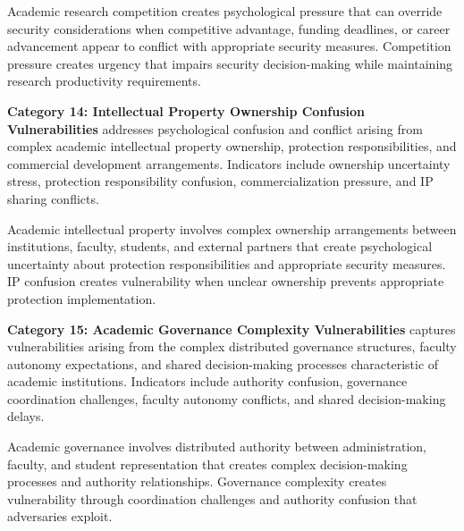 \documentclass[10pt, twocolumn]{article}
\begin{document}
Academic research competition creates psychological pressure that can override security considerations when competitive advantage, funding deadlines, or career advancement appear to conflict with appropriate security measures. Competition pressure creates urgency that impairs security decision-making while maintaining research productivity requirements.

\textbf{Category 14: Intellectual Property Ownership Confusion Vulnerabilities} addresses psychological confusion and conflict arising from complex academic intellectual property ownership, protection responsibilities, and commercial development arrangements. Indicators include ownership uncertainty stress, protection responsibility confusion, commercialization pressure, and IP sharing conflicts.

Academic intellectual property involves complex ownership arrangements between institutions, faculty, students, and external partners that create psychological uncertainty about protection responsibilities and appropriate security measures. IP confusion creates vulnerability when unclear ownership prevents appropriate protection implementation.

\textbf{Category 15: Academic Governance Complexity Vulnerabilities} captures vulnerabilities arising from the complex distributed governance structures, faculty autonomy expectations, and shared decision-making processes characteristic of academic institutions. Indicators include authority confusion, governance coordination challenges, faculty autonomy conflicts, and shared decision-making delays.

Academic governance involves distributed authority between administration, faculty, and student representation that creates complex decision-making processes and authority relationships. Governance complexity creates vulnerability through coordination challenges and authority confusion that adversaries exploit.
\end{document}

